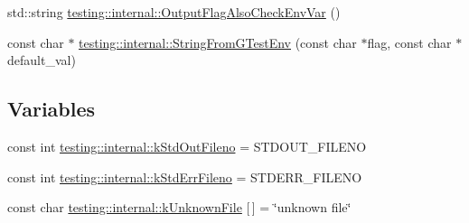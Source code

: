 \begin{DoxyCompactItemize}
\item 
std\+::string \mbox{\hyperlink{namespacetesting_1_1internal_a0c793c6d84760d900299916c077a1af4}{testing\+::internal\+::\+Output\+Flag\+Also\+Check\+Env\+Var}} ()
\item 
const char $\ast$ \mbox{\hyperlink{namespacetesting_1_1internal_a7ed785df46a339403b0f749d3a879201}{testing\+::internal\+::\+String\+From\+G\+Test\+Env}} (const char $\ast$flag, const char $\ast$default\+\_\+val)
\end{DoxyCompactItemize}
\subsection*{Variables}
\begin{DoxyCompactItemize}
\item 
const int \mbox{\hyperlink{namespacetesting_1_1internal_a24f0a3d50cac54a9132f4828ec9b96d9}{testing\+::internal\+::k\+Std\+Out\+Fileno}} = S\+T\+D\+O\+U\+T\+\_\+\+F\+I\+L\+E\+NO
\item 
const int \mbox{\hyperlink{namespacetesting_1_1internal_a747eccfdbdee3ff8af3bedc476a57c85}{testing\+::internal\+::k\+Std\+Err\+Fileno}} = S\+T\+D\+E\+R\+R\+\_\+\+F\+I\+L\+E\+NO
\item 
const char \mbox{\hyperlink{namespacetesting_1_1internal_abae7a5775c901f2fd12b058b00d09840}{testing\+::internal\+::k\+Unknown\+File}} \mbox{[}$\,$\mbox{]} = \char`\"{}unknown file\char`\"{}
\end{DoxyCompactItemize}
